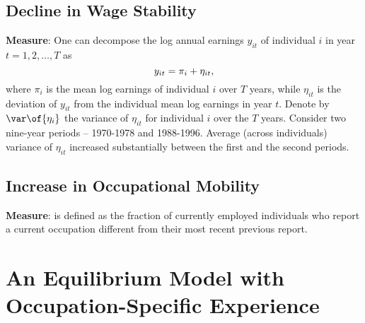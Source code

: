 \documentclass[12pt]{article}
\newcommand{\highlightB}[1]{{\emph{\color{MyBlue}{#1}}}}
\theoremstyle{definition}
\begin{document}
\subsection{Decline in Wage Stability}
{\bf Measure}: One can decompose the log annual earnings $y_{it}$ of individual $i$ in year $t = 1, 2, \ldots, T$ as 
\begin{equation}
	\notag
	y_{it} = \pi_i + \eta_{it},
\end{equation}
where $\pi_i$ is the mean log earnings of individual $i$ over $T$ years, while $\eta_{it}$ is the deviation of $y_{it}$ from the individual mean log earnings in year $t$. Denote by $\var\of{\eta_i}$ the variance of $\eta_{{it}}$ for individual $i$ over the $T$ years. Consider two nine-year periods -- 1970-1978 and 1988-1996. Average (across individuals) variance of $\eta_{it}$ increased substantially between the first and the second periods.

\subsection{Increase in Occupational Mobility}

{\bf Measure}: \highlightB{Occupational mobility} is defined as the fraction of currently employed individuals who report a current occupation different from their most recent previous report.

\section{An Equilibrium Model with Occupation-Specific Experience} 
\end{document}

